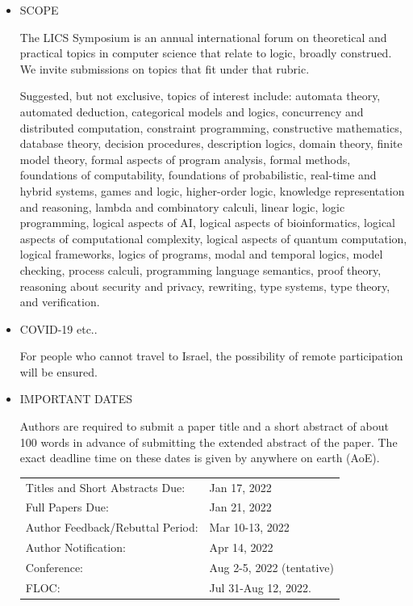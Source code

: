 \documentclass[prodmode,acmtecs]{acmsmall} %
\begin{document}
\begin{itemize}\item  SCOPE  
 
  The LICS Symposium is an annual international forum on theoretical and practical topics in computer science that relate to logic, broadly construed. We invite submissions on topics that fit under that rubric.  
 
  Suggested, but not exclusive, topics of interest include: automata theory, automated deduction, categorical models and logics, concurrency and distributed computation, constraint programming, constructive mathematics, database theory, decision procedures, description logics, domain theory, finite model theory, formal aspects of program analysis, formal methods, foundations of computability, foundations of probabilistic, real-time and hybrid systems, games and logic, higher-order logic, knowledge representation and reasoning, lambda and combinatory calculi, linear logic, logic programming, logical aspects of AI, logical aspects of bioinformatics, logical aspects of computational complexity, logical aspects of quantum computation, logical frameworks, logics of programs, modal and temporal logics, model checking, process calculi, programming language semantics, proof theory, reasoning about security and privacy, rewriting, type systems, type theory, and verification. 
 
\item  COVID-19 etc.. 
 
  For people who cannot travel to Israel, the possibility of remote participation will be ensured. 
 
\item  IMPORTANT DATES 
 
  Authors are required to submit a paper title and a short abstract of about 100 words in advance of submitting the extended abstract of the paper. The exact deadline time on these dates is given by anywhere on earth (AoE). 
 
\begin{tabulary}{\linewidth}{LL}Titles and Short Abstracts Due:  & Jan 17, 2022 \\
Full Papers Due:  & Jan 21, 2022 \\
Author Feedback/Rebuttal Period:  & Mar 10-13, 2022 \\
Author Notification:  & Apr 14, 2022 \\
Conference:  & Aug 2-5,  2022 (tentative) \\
FLOC:  & Jul 31-Aug 12, 2022. \\
\end{tabulary}
 

\end{itemize}
\end{document}
